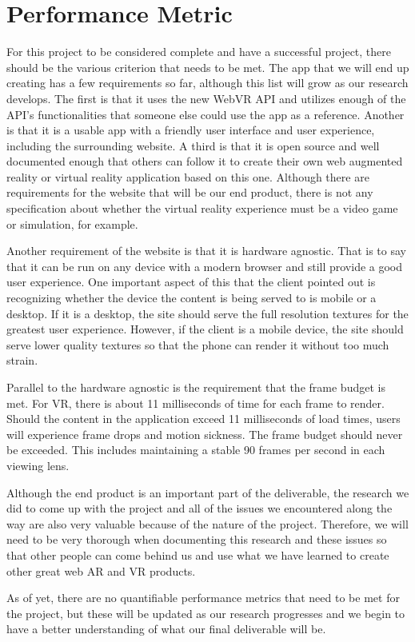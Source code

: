 \section{Performance Metric}
\label{sec:PerformanceMetric}
For this project to be considered complete and have a successful project, there should be the various criterion that needs to be met. The app that we will end up creating has a few requirements so far, although this list will grow as our research develops. The first is that it uses the new WebVR API and utilizes enough of the API’s functionalities that someone else could use the app as a reference. Another is that it is a usable app with a friendly user interface and user experience, including the surrounding website. A third is that it is open source and well documented enough that others can follow it to create their own web augmented reality or virtual reality application based on this one. Although there are requirements for the website that will be our end product, there is not any specification about whether the virtual reality experience must be a video game or simulation, for example.

Another requirement of the website is that it is hardware agnostic. That is to say that it can be run on any device with a modern browser and still provide a good user experience. One important aspect of this that the client pointed out is recognizing whether the device the content is being served to is mobile or a desktop. If it is a desktop, the site should serve the full resolution textures for the greatest user experience. However, if the client is a mobile device, the site should serve lower quality textures so that the phone can render it without too much strain.

Parallel to the hardware agnostic is the requirement that the frame budget is met. For VR, there is about 11 milliseconds of time for each frame to render. Should the content in the application exceed 11 milliseconds of load times, users will experience frame drops and motion sickness. The frame budget should never be exceeded. This includes maintaining a stable 90 frames per second in each viewing lens.

Although the end product is an important part of the deliverable, the research we did to come up with the project and all of the issues we encountered along the way are also very valuable because of the nature of the project. Therefore, we will need to be very thorough when documenting this research and these issues so that other people can come behind us and use what we have learned to create other great web AR and VR products. 

As of yet, there are no quantifiable performance metrics that need to be met for the project, but these will be updated as our research progresses and we begin to have a better understanding of what our final deliverable will be. 